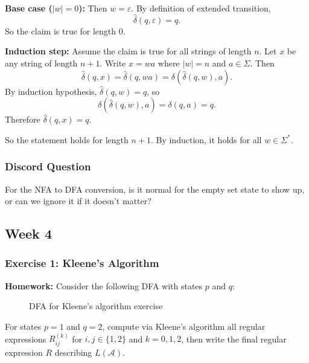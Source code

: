 \documentclass{article}
\theoremstyle{theorem}
\theoremstyle{definition}
\theoremstyle{remark}
\begin{document}
\textbf{Base case ($|w|=0$):} 
Then $w=\varepsilon$. By definition of extended transition,
\[
\hat{\delta}(q,\varepsilon)=q.
\]
So the claim is true for length $0$.

\textbf{Induction step:}
Assume the claim is true for all strings of length $n$. Let $x$ be any string of length $n+1$.
Write $x=wa$ where $|w|=n$ and $a\in\Sigma$.
Then
\[
\hat{\delta}(q,x)=\hat{\delta}(q,wa)=\delta(\hat{\delta}(q,w),a).
\]
By induction hypothesis, $\hat{\delta}(q,w)=q$, so
\[
\delta(\hat{\delta}(q,w),a)=\delta(q,a)=q.
\]
Therefore $\hat{\delta}(q,x)=q$.

So the statement holds for length $n+1$. By induction, it holds for all $w\in\Sigma^*$.

\subsubsection{Discord Question}

For the NFA to DFA conversion, is it normal for the empty set state to show up, or can we ignore it if it doesn’t matter?

\subsection{Week 4}

\subsubsection{Exercise 1: Kleene's Algorithm}

\textbf{Homework:} Consider the following DFA with states $p$ and $q$:

\begin{figure}[H]
  \centering
  \caption{DFA for Kleene's algorithm exercise}
\end{figure}

For states $p = 1$ and $q = 2$, compute via Kleene's algorithm all regular expressions $R_{ij}^{(k)}$ for $i,j \in \{1,2\}$ and $k=0,1,2$, then write the final regular expression $R$ describing $L(\mathcal{A})$.
\end{document}
